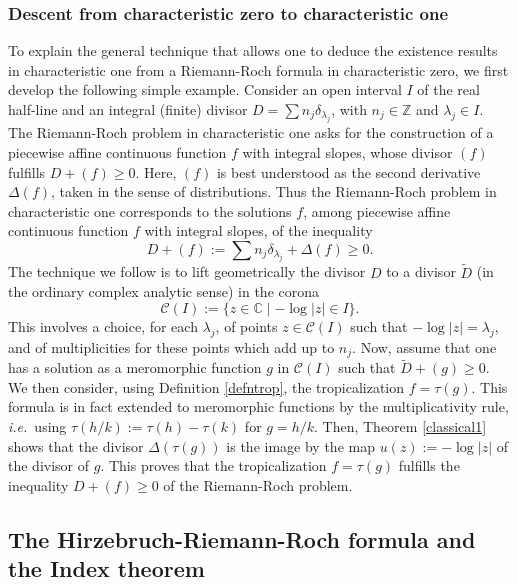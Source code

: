 \documentclass[graybox, envcountsect%
]{svmult}
\def\C{{\mathbb C}}
\def\Z{{\mathbb Z}}
\def\cC{{\mathcal C}}
\newcommand{\ie}{{\it i.e.\/}\ }
\begin{document}
\subsubsection{Descent from characteristic zero to characteristic one}\label{subsubsec:3.2.3}

To explain the general technique that allows one to deduce the existence results in characteristic one from a Riemann-Roch formula in characteristic zero, we first develop the following simple example.  Consider an open interval $I$ of the real half-line and an integral (finite) divisor  $D=\sum n_j \delta_{\lambda_j}$, with $n_j\in \Z$ and $\lambda_j\in I$. The Riemann-Roch problem in characteristic one asks for the  construction of  a piecewise affine continuous function $f$ with integral slopes, whose divisor $(f)$ fulfills $D+(f)\geq 0$. Here, $(f)$ is best understood as the second derivative $\Delta(f)$, taken in the sense of distributions. Thus the Riemann-Roch problem in characteristic one corresponds to the solutions $f$, among piecewise affine continuous function $f$ with integral slopes, of the inequality 
\begin{equation}\label{rrchar1}
D+(f):=\sum n_j \delta_{\lambda_j}+\Delta(f)\geq 0.
\end{equation}
The technique we follow is to lift geometrically the divisor $D$ to a divisor $\tilde D$ (in the ordinary complex analytic sense) in the corona 
$$
\cC(I):=\{z\in \C\mid -\log \vert z\vert \in I\}.
$$
This involves a choice, for each $\lambda_j$, of points $z\in \cC(I)$ such that $-\log \vert z\vert=\lambda_j$, and of multiplicities for these points which add up to $n_j$. Now, assume that one has a solution as a meromorphic function $g$ in $\cC(I)$  such that 
$\tilde D+ (g)\geq 0$. We then consider, using Definition 
\ref{defntrop}, the tropicalization $f=\tau(g)$. 
 This formula is in fact extended to meromorphic functions by the multiplicativity rule, \ie using $\tau(h/k):=\tau(h)-\tau(k)$ for $g=h/k$. Then, Theorem \ref{classical1} shows that the divisor $\Delta(\tau(g))$ is the image by the map $u(z):=-\log \vert z\vert$ of the divisor of $g$.  This proves that the tropicalization $f=\tau(g)$ fulfills the inequality $D+(f)\geq 0$ of the Riemann-Roch problem. 
 

 


\subsection{The Hirzebruch-Riemann-Roch formula and the Index theorem}\label{subsect:3.3}
\end{document}
